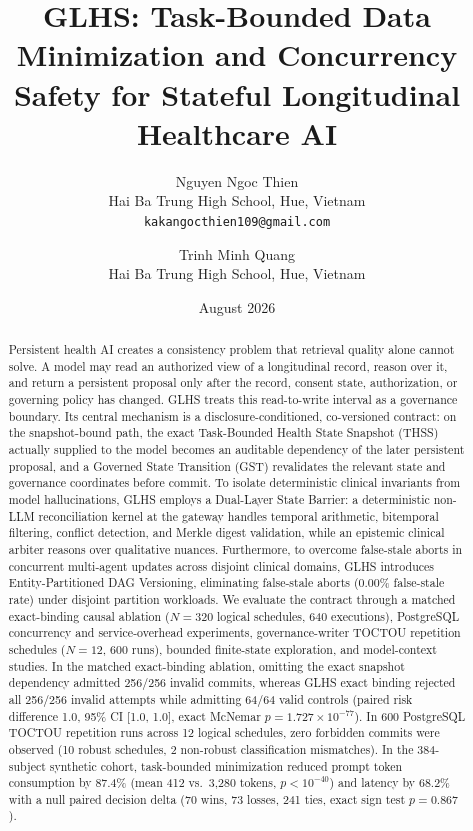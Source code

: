 \documentclass[11pt]{article}
\title{\textbf{GLHS: Task-Bounded Data Minimization and Concurrency Safety for Stateful Longitudinal Healthcare AI}}
\author{Nguyen Ngoc Thien\\
Hai Ba Trung High School, Hue, Vietnam\\
\texttt{kakangocthien109@gmail.com}
\and
Trinh Minh Quang\\
Hai Ba Trung High School, Hue, Vietnam}
\date{August 2026}
\begin{document}
\maketitle

\begin{abstract}
Persistent health AI creates a consistency problem that retrieval quality alone cannot solve. A model may read an authorized view of a longitudinal record, reason over it, and return a persistent proposal only after the record, consent state, authorization, or governing policy has changed. GLHS treats this read-to-write interval as a governance boundary. Its central mechanism is a disclosure-conditioned, co-versioned contract: on the snapshot-bound path, the exact Task-Bounded Health State Snapshot (THSS) actually supplied to the model becomes an auditable dependency of the later persistent proposal, and a Governed State Transition (GST) revalidates the relevant state and governance coordinates before commit. To isolate deterministic clinical invariants from model hallucinations, GLHS employs a Dual-Layer State Barrier: a deterministic non-LLM reconciliation kernel at the gateway handles temporal arithmetic, bitemporal filtering, conflict detection, and Merkle digest validation, while an epistemic clinical arbiter reasons over qualitative nuances. Furthermore, to overcome false-stale aborts in concurrent multi-agent updates across disjoint clinical domains, GLHS introduces Entity-Partitioned DAG Versioning, eliminating false-stale aborts (0.00\% false-stale rate) under disjoint partition workloads. We evaluate the contract through a matched exact-binding causal ablation ($N=320$ logical schedules, 640 executions), PostgreSQL concurrency and service-overhead experiments, governance-writer TOCTOU repetition schedules ($N=12$, 600 runs), bounded finite-state exploration, and model-context studies. In the matched exact-binding ablation, omitting the exact snapshot dependency admitted 256/256 invalid commits, whereas GLHS exact binding rejected all 256/256 invalid attempts while admitting 64/64 valid controls (paired risk difference 1.0, 95\% CI [1.0, 1.0], exact McNemar $p=1.727\times 10^{-77}$). In 600 PostgreSQL TOCTOU repetition runs across 12 logical schedules, zero forbidden commits were observed (10 robust schedules, 2 non-robust classification mismatches). In the 384-subject synthetic cohort, task-bounded minimization reduced prompt token consumption by 87.4\% (mean 412 vs.\ 3,280 tokens, $p < 10^{-40}$) and latency by 68.2\% with a null paired decision delta (70 wins, 73 losses, 241 ties, exact sign test $p=0.867$).
\end{abstract}
\end{document}
